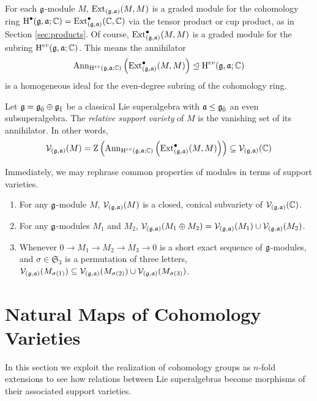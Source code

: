 For each $\mathfrak{g}$-module $M$, $\operatorname{Ext}_{(\mathfrak{g},\mathfrak{a})}(M,M)$ is a graded module for the cohomology ring $\operatorname{H}^\bullet(\mathfrak{g},\mathfrak{a};\mathbb{C}) = \operatorname{Ext}_{(\mathfrak{g},\mathfrak{a})}^\bullet(\mathbb{C},\mathbb{C})$ via the tensor product or cup product, as in Section \ref{sec:products}. Of course, $\operatorname{Ext}_{(\mathfrak{g},\mathfrak{a})}^\bullet(M,M)$ is a graded module for the subring $\operatorname{H}^{ev}(\mathfrak{g},\mathfrak{a};\mathbb{C})$. This means the annihilator
\[
  \operatorname{Ann}_{\operatorname{H}^{ev}(\mathfrak{g},\mathfrak{a};\mathbb{C})}\left(\operatorname{Ext}_{(\mathfrak{g},\mathfrak{a})}^\bullet(M,M)\right) \trianglelefteq \operatorname{H}^{ev}(\mathfrak{g},\mathfrak{a};\mathbb{C})
\]
is a homogeneous ideal for the even-degree subring of the cohomology ring.

\begin{definition}
  Let $\mathfrak{g} = {\mathfrak{g}}_{\bar{0}} \oplus {\mathfrak{g}}_{\bar{1}}$ be a classical Lie superalgebra with $\mathfrak{a} \leq {\mathfrak{g}}_{\bar{0}}$ an even subsuperalgebra. The \emph{relative support variety} of $M$ is the vanishing set of its annihilator. In other words,
  \[
    \mathcal{V}_{(\mathfrak{g},\mathfrak{a})}(M) = \operatorname{Z}\left( \operatorname{Ann}_{\operatorname{H}^{ev}(\mathfrak{g},\mathfrak{a};\mathbb{C})}\left(\operatorname{Ext}_{(\mathfrak{g},\mathfrak{a})}^\bullet(M,M)\right)\right) \subseteq \mathcal{V}_{(\mathfrak{g},\mathfrak{a})}(\mathbb{C})
  \]
\end{definition}

Immediately, we may rephrase common properties of modules in terms of support varieties.

\begin{proposition}
  \begin{enumerate}
  \item For any $\mathfrak{g}$-module $M$, $\mathcal{V}_{(\mathfrak{g},\mathfrak{a})}(M)$ is a closed, conical subvariety of $\mathcal{V}_{(\mathfrak{g},\mathfrak{a})}(\mathbb{C})$.
  \item For any $\mathfrak{g}$-modules $M_1$ and $M_2$, $\mathcal{V}_{(\mathfrak{g},\mathfrak{a})}(M_1 \oplus M_2) = \mathcal{V}_{(\mathfrak{g},\mathfrak{a})}(M_1) \cup \mathcal{V}_{(\mathfrak{g},\mathfrak{a})}(M_2)$.
  \item Whenever $0 \to M_1 \to M_2 \to M_3 \to 0$ is a short exact sequence of $\mathfrak{g}$-modules, and $\sigma \in \mathfrak{S}_3$ is a permutation of three letters, $\mathcal{V}_{(\mathfrak{g},\mathfrak{a})}(M_{\sigma(1)}) \subseteq \mathcal{V}_{(\mathfrak{g},\mathfrak{a})}(M_{\sigma(2)}) \cup \mathcal{V}_{(\mathfrak{g},\mathfrak{a})}(M_{\sigma(3)})$.
\end{enumerate}
\end{proposition}

\section{Natural Maps of Cohomology Varieties}
\label{sec:natural-maps}

In this section we exploit the realization of cohomology groups as $n$-fold extensions to see how relations between Lie superalgebras become morphisms of their associated support varieties.

